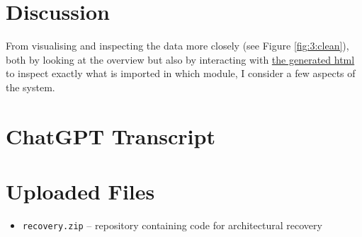 \documentclass{article}
\begin{document}
\section{Discussion}
\label{discussion}

From visualising and inspecting the data more closely (see Figure \ref{fig:3:clean}), 
both by looking at the overview but also by interacting with 
\href{https://github.com/bjarkebrodin/recovery/blob/master/top_lvl_imports.html}{the generated html}
to inspect exactly what is imported in which module,
I consider a few aspects of the system.






\clearpage



\clearpage
\appendix
\section{ChatGPT Transcript}
\label{apx:a}
\begin{figure}[h]

\end{figure}


\clearpage
\section{Uploaded Files}
\label{apx:b}
\begin{itemize}
  \item \verb|recovery.zip| -- repository containing code for architectural recovery
\end{itemize}
\end{document}
